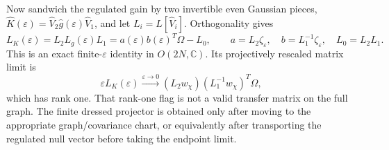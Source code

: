 \documentclass[aps,prb,onecolumn,nofootinbib,superscriptaddress]{revtex4-2}
\theoremstyle{plain}
\theoremstyle{definition}
\begin{document}
Now sandwich the regulated gain by two invertible even Gaussian pieces,
\(\hat K(\varepsilon)=\hat V_2\hat g(\varepsilon)\hat V_1\), and let
\(L_i=L[\hat V_i]\).  Orthogonality gives
\begin{equation}
  L_K(\varepsilon)
  =
  L_2L_g(\varepsilon)L_1
  =
  a(\varepsilon)b(\varepsilon)^T\Omega-L_0,
  \qquad
  a=L_2\zeta_\varepsilon,\quad
  b=L_1^{-1}\zeta_\varepsilon,\quad
  L_0=L_2L_1 .
  \label{eq:single-insertion-rank-one-correction}
\end{equation}
This is an exact finite-\(\varepsilon\) identity in \(O(2N,\mathbb C)\).  Its
projectively rescaled matrix limit is
\begin{equation}
  \varepsilon L_K(\varepsilon)
  \xrightarrow{\varepsilon\to0}
  (L_2w_\chi)(L_1^{-1}w_\chi)^T\Omega ,
  \label{eq:single-insertion-rank-one-projective-limit}
\end{equation}
which has rank one.  That rank-one flag is not a valid transfer matrix on the
full graph.  The finite dressed projector is obtained only after moving to
the appropriate graph/covariance chart, or equivalently after transporting
the regulated null vector before taking the endpoint limit.
\end{document}

